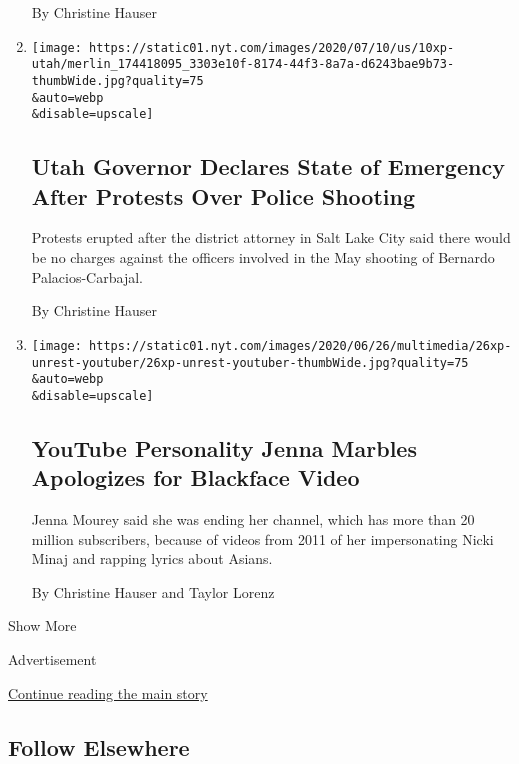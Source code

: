 \begin{enumerate}
  By Christine Hauser
\item
  \href{/2020/07/10/us/utah-state-of-emergency.html}{}

  \texttt{[image: https://static01.nyt.com/images/2020/07/10/us/10xp-utah/merlin\_174418095\_3303e10f-8174-44f3-8a7a-d6243bae9b73-thumbWide.jpg?quality=75\\\&auto=webp\\\&disable=upscale]}

  \hypertarget{utah-governor-declares-state-of-emergency-after-protests-over-police-shooting}{%
  \subsection{Utah Governor Declares State of Emergency After Protests
  Over Police
  Shooting}\label{utah-governor-declares-state-of-emergency-after-protests-over-police-shooting}}

  Protests erupted after the district attorney in Salt Lake City said
  there would be no charges against the officers involved in the May
  shooting of Bernardo Palacios-Carbajal.

  By Christine Hauser
\item
  \href{/2020/06/26/us/jenna-marbles-leaves-youtube.html}{}

  \texttt{[image: https://static01.nyt.com/images/2020/06/26/multimedia/26xp-unrest-youtuber/26xp-unrest-youtuber-thumbWide.jpg?quality=75\\\&auto=webp\\\&disable=upscale]}

  \hypertarget{youtube-personality-jenna-marbles-apologizes-for-blackface-video}{%
  \subsection{YouTube Personality Jenna Marbles Apologizes for Blackface
  Video}\label{youtube-personality-jenna-marbles-apologizes-for-blackface-video}}

  Jenna Mourey said she was ending her channel, which has more than 20
  million subscribers, because of videos from 2011 of her impersonating
  Nicki Minaj and rapping lyrics about Asians.

  By Christine Hauser and Taylor Lorenz
\end{enumerate}

Show More

Advertisement

\protect\hyperlink{after-mid2}{Continue reading the main story}

\hypertarget{follow-elsewhere}{%
\subsection{Follow Elsewhere}\label{follow-elsewhere}}

